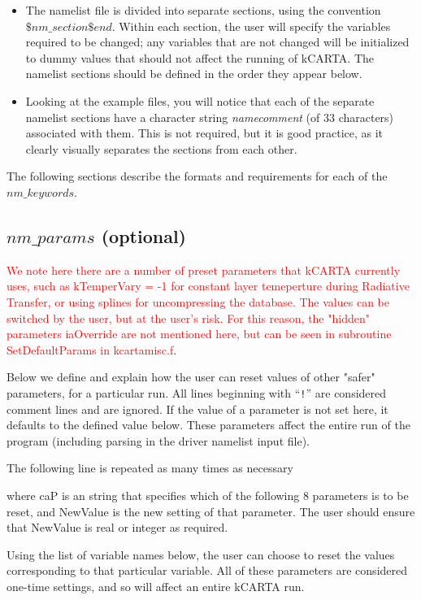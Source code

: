 \documentclass[12pt]{article}
\newcommand{\kc}{\textsf{kCARTA}\xspace}
\newcommand{\ttab}{\indent\indent}
\begin{document}
\begin{itemize}
\item The namelist file is divided into separate sections, using the convention
 {$ \$nm\_section  \$end$}. Within each section, the user will specify the
 variables required to be changed; any variables that are not changed will be
 initialized to dummy values that should not affect the running of \kc. 
 The namelist sections should be defined in the order they appear below.
\item Looking at the example files, you will notice that each of the separate
  namelist sections have a character string {\em namecomment} (of 33 
  characters) associated with them. This is not required, but it is good 
  practice, as it clearly visually separates the sections from each other.
\end{itemize}

The following sections describe the formats and requirements for
each of the $nm\_keywords$.

\subsection{$nm\_params$ (optional)}

\textcolor{red}{We note here there are a number of preset
parameters that kCARTA currently uses, such as kTemperVary = -1 for constant
layer temeperture during Radiative Transfer, or using splines for uncompressing
the database. The values can be switched by the user, but at the user's risk.
For this reason, the "hidden" parameters iaOverride are not mentioned here,
but can be seen in subroutine SetDefaultParams in kcartamisc.f}.

Below we define and explain how the user can reset values of other "safer" parameters,
for a particular run. All lines beginning with ``{\tt !}'' are considered
comment lines and are ignored.  If the value of a parameter is not
set here, it defaults to the defined value below.  These parameters affect 
the entire run of the program (including parsing in the
driver namelist input file).

The following line is  repeated as many times as necessary

\medskip
\ttab {\sf caP = NewValue}
\medskip

\noindent
where {\sf caP} is an string that specifies which of the 
following 8 parameters is to be reset, and {\sf NewValue} is the new 
setting of that parameter.  The user should ensure that {\sf NewValue} 
is real or integer as required.

Using the list of variable names below, the user can choose to reset
the values corresponding to that particular variable.  All of these
parameters are considered one-time settings, and so will affect an
entire \kc run.
\end{document}
